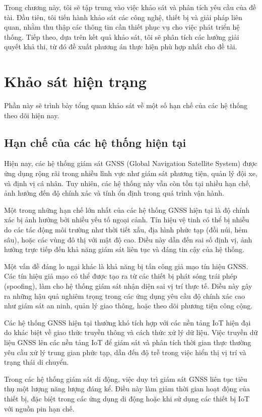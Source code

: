 \documentclass[../DoAn.tex]{subfiles}
\begin{document}
Trong chương này, tôi sẽ tập trung vào việc khảo sát và phân tích yêu cầu của đề tài. Đầu tiên, tôi tiến hành khảo sát các công nghệ, thiết bị và giải pháp liên quan, nhằm thu thập các thông tin cần thiết phục vụ cho việc phát triển hệ thống. Tiếp theo, dựa trên kết quả khảo sát, tôi sẽ phân tích các hướng giải quyết khả thi, từ đó đề xuất phương án thực hiện phù hợp nhất cho đề tài.

\section{Khảo sát hiện trạng}
\label{section:2.1}
Phần này sẽ trình bày tổng quan khảo sát về một số hạn chế của các hệ thống theo dõi hiện nay.
\subsection{Hạn chế của các hệ thống hiện tại}
\label{subsection:2.1.1}
Hiện nay, các hệ thống giám sát GNSS (Global Navigation Satellite System) được ứng dụng rộng rãi trong nhiều lĩnh vực như giám sát phương tiện, quản lý đội xe, và định vị cá nhân. Tuy nhiên, các hệ thống này vẫn còn tồn tại nhiều hạn chế, ảnh hưởng đến độ chính xác và tính ổn định trong quá trình vận hành.

Một trong những hạn chế lớn nhất của các hệ thống GNSS hiện tại là độ chính xác bị ảnh hưởng bởi nhiều yếu tố ngoại cảnh. Tín hiệu vệ tinh có thể bị nhiễu do các tác động môi trường như thời tiết xấu, địa hình phức tạp (đồi núi, hẻm sâu), hoặc các vùng đô thị với mật độ cao. Điều này dẫn đến sai số định vị, ảnh hưởng trực tiếp đến khả năng giám sát liên tục và đáng tin cậy của hệ thống.

Một vấn đề đáng lo ngại khác là khả năng bị tấn công giả mạo tín hiệu GNSS. Các tín hiệu giả mạo có thể được tạo ra từ các thiết bị phát sóng trái phép (spoofing), làm cho hệ thống giám sát nhận diện sai vị trí thực tế. Điều này gây ra những hậu quả nghiêm trọng trong các ứng dụng yêu cầu độ chính xác cao như giám sát an ninh, quản lý giao thông, hoặc theo dõi phương tiện công cộng.

Các hệ thống GNSS hiện tại thường khó tích hợp với các nền tảng IoT hiện đại do khác biệt về giao thức truyền thông và cách thức xử lý dữ liệu. Việc truyền dữ liệu GNSS lên các nền tảng IoT để giám sát và phân tích thời gian thực thường yêu cầu xử lý trung gian phức tạp, dẫn đến độ trễ trong việc hiển thị vị trí và trạng thái di chuyển.

Trong các hệ thống giám sát di động, việc duy trì giám sát GNSS liên tục tiêu thụ một lượng năng lượng đáng kể. Điều này làm giảm thời gian hoạt động của thiết bị, đặc biệt trong các ứng dụng di động hoặc khi sử dụng các thiết bị IoT với nguồn pin hạn chế.
\end{document}
